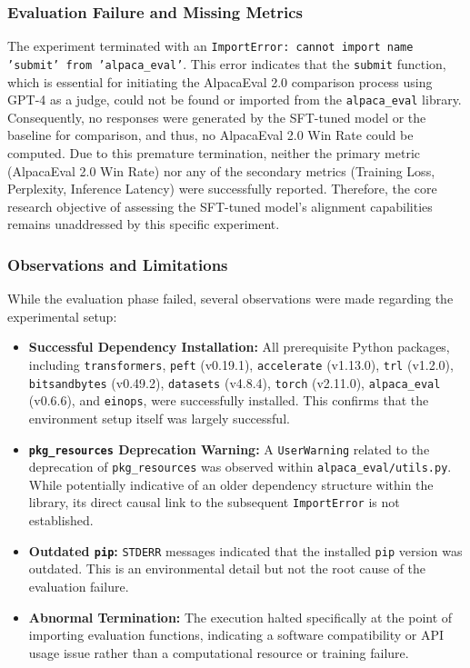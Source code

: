 \documentclass[11pt]{article}
\begin{document}
\subsubsection{Evaluation Failure and Missing Metrics}
The experiment terminated with an \texttt{ImportError: cannot import name 'submit' from 'alpaca\_eval'}. This error indicates that the \texttt{submit} function, which is essential for initiating the AlpacaEval 2.0 comparison process using GPT-4 as a judge, could not be found or imported from the \texttt{alpaca\_eval} library. Consequently, no responses were generated by the SFT-tuned model or the baseline for comparison, and thus, no AlpacaEval 2.0 Win Rate could be computed. Due to this premature termination, neither the primary metric (AlpacaEval 2.0 Win Rate) nor any of the secondary metrics (Training Loss, Perplexity, Inference Latency) were successfully reported. Therefore, the core research objective of assessing the SFT-tuned model's alignment capabilities remains unaddressed by this specific experiment.

\subsubsection{Observations and Limitations}
While the evaluation phase failed, several observations were made regarding the experimental setup:
\begin{itemize}
    \item \textbf{Successful Dependency Installation:} All prerequisite Python packages, including \texttt{transformers}, \texttt{peft} (v0.19.1), \texttt{accelerate} (v1.13.0), \texttt{trl} (v1.2.0), \texttt{bitsandbytes} (v0.49.2), \texttt{datasets} (v4.8.4), \texttt{torch} (v2.11.0), \texttt{alpaca\_eval} (v0.6.6), and \texttt{einops}, were successfully installed. This confirms that the environment setup itself was largely successful.
    \item \textbf{\texttt{pkg\_resources} Deprecation Warning:} A \texttt{UserWarning} related to the deprecation of \texttt{pkg\_resources} was observed within \texttt{alpaca\_eval/utils.py}. While potentially indicative of an older dependency structure within the library, its direct causal link to the subsequent \texttt{ImportError} is not established.
    \item \textbf{Outdated \texttt{pip}:} \texttt{STDERR} messages indicated that the installed \texttt{pip} version was outdated. This is an environmental detail but not the root cause of the evaluation failure.
    \item \textbf{Abnormal Termination:} The execution halted specifically at the point of importing evaluation functions, indicating a software compatibility or API usage issue rather than a computational resource or training failure.
\end{itemize}
\end{document}
